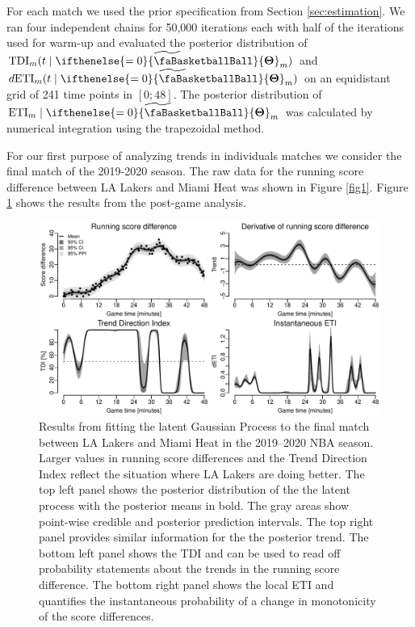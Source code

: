 \documentclass[
  11pt,
]{svjour3}
\theoremstyle{nonumberplain}
\begin{document}
For each match we used the prior specification from Section
\ref{sec:estimation}. We ran four independent chains for 50,000
iterations each with half of the iterations used for warm-up and
evaluated the posterior distribution of
\(\textrm{TDI}_m(t \mid \widetilde{\ifthenelse{\value{bbsym4theta}=0}{\text{\faBasketballBall}}{\mathbf{\Theta}}}_m)\)
and
\(d\mathrm{ETI}_m(t \mid \widetilde{\ifthenelse{\value{bbsym4theta}=0}{\text{\faBasketballBall}}{\mathbf{\Theta}}}_m)\)
on an equidistant grid of 241 time points in \([0; 48]\). The posterior
distribution of
\(\text{ETI}_m \mid \widetilde{\ifthenelse{\value{bbsym4theta}=0}{\text{\faBasketballBall}}{\mathbf{\Theta}}}_m\)
was calculated by numerical integration using the trapezoidal method.

For our first purpose of analyzing trends in individuals matches we
consider the final match of the 2019-2020 season. The raw data for the
running score difference between LA Lakers and Miami Heat was shown in
Figure \ref{fig1}. Figure \ref{fig1b} shows the results from the
post-game analysis.

\begin{figure}[htbp]
\includegraphics{fig2.pdf}
\caption{Results from fitting the latent Gaussian Process to the final match between LA Lakers and Miami Heat in the 2019--2020 NBA season. Larger values in running score differences and the Trend Direction Index reflect the situation where LA Lakers are doing better. The top left panel shows the posterior distribution of the the latent process with the posterior means in bold. The gray areas show point-wise credible and posterior prediction intervals. The top right panel provides similar information for the the posterior trend. The bottom left panel shows the TDI and can be used to read off probability statements about the trends in the running score difference. The bottom right panel shows the local ETI and quantifies the instantaneous probability of a change in monotonicity of the score differences.}
\label{fig1b}
\end{figure}
\end{document}
